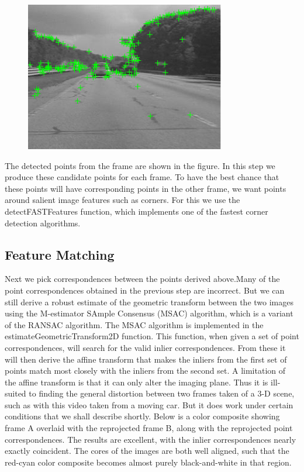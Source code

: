\documentclass[a4paper]{article}
\begin{document}
	\begin{figure}[htpb!] 
		\centering 
		\includegraphics{FeatureDetection.png}
	\end{figure}
	The detected points from the frame are shown in the figure.
	\hfill \break
	In this step we produce these candidate points for each frame. To have the best chance that these points will have corresponding points in the other frame, we want points around salient image features such as corners. For this we use the detectFASTFeatures function, which implements one of the fastest corner detection algorithms.
	
	\subsection{Feature Matching}
	Next we pick correspondences between the points derived above.Many of the point correspondences obtained in the previous step are incorrect. But we can still derive a robust estimate of the geometric transform between the two images using the M-estimator SAmple Consensus (MSAC) algorithm, which is a variant of the RANSAC algorithm. The MSAC algorithm is implemented in the estimateGeometricTransform2D function. This function, when given a set of point correspondences, will search for the valid inlier correspondences. From these it will then derive the affine transform that makes the inliers from the first set of points match most closely with the inliers from the second set. 
	A limitation of the affine transform is that it can only alter the imaging plane. Thus it is ill-suited to finding the general distortion between two frames taken of a 3-D scene, such as with this video taken from a moving car. But it does work under certain conditions that we shall describe shortly.
	Below is a color composite showing frame A overlaid with the reprojected frame B, along with the reprojected point correspondences. The results are excellent, with the inlier correspondences nearly exactly coincident. The cores of the images are both well aligned, such that the red-cyan color composite becomes almost purely black-and-white in that region.
	
\end{document}
